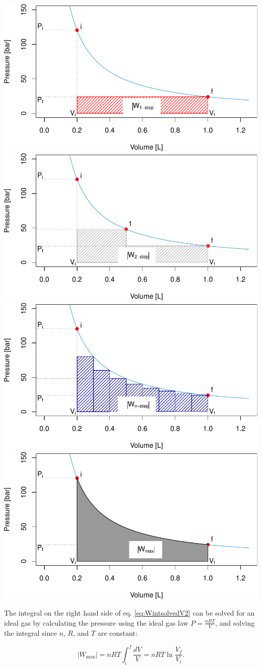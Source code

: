 \documentclass[
  9pt,
]{extbook}
\theoremstyle{definition}
\theoremstyle{definition}
\theoremstyle{definition}
\theoremstyle{remark}
\begin{document}
\includegraphics[width=0.5\linewidth,height=1\textheight]{pchem1_files/figure-latex/figures-side-1} \includegraphics[width=0.5\linewidth,height=1\textheight]{pchem1_files/figure-latex/figures-side-2} \includegraphics[width=0.5\linewidth,height=1\textheight]{pchem1_files/figure-latex/figures-side-3} \includegraphics[width=0.5\linewidth,height=1\textheight]{pchem1_files/figure-latex/figures-side-4}

The integral on the right hand side of eq. \eqref{eq:WintsolvedV2} can be solved for an ideal gas by calculating the pressure using the ideal gas law \(P=\frac{nRT}{V}\), and solving the integral since \(n\), \(R\), and \(T\) are constant:

\begin{equation}
  \left| W_{\text{max}} \right| = nRT \int_{i}^{f} \frac{dV}{V} = nRT \ln \frac{V_f}{V_i}.
  \label{eq:WmaxV}
\end{equation}
\end{document}
